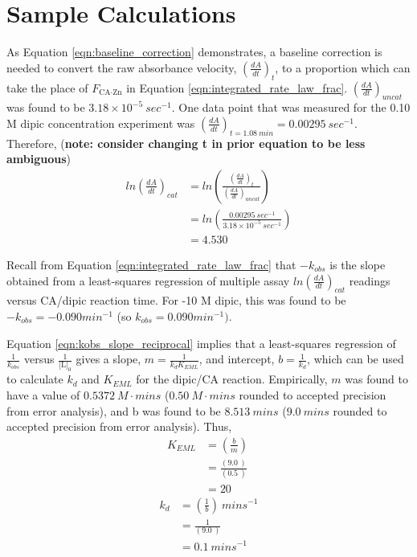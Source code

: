 \section{Sample Calculations}
As Equation \eqref{eqn:baseline_correction} demonstrates, a baseline correction is needed to convert the raw absorbance velocity, $\left(\frac{dA}{dt}\right)_{t}$, to a proportion which can take the place of $F_\text{CA$\cdot$Zn}$ in Equation \eqref{eqn:integrated_rate_law_frac}. $\left(\frac{dA}{dt}\right)_{uncat}$ was found to be $3.18\times10^{-5}\ sec^{-1}$. One data point that was measured for the 0.10 M dipic concentration experiment was $\left(\frac{dA}{dt}\right)_{t=1.08\ min}=0.00295\ sec^{-1}$. Therefore, (\textbf{note: consider changing t in prior equation to be less ambiguous}) 
\begin{equation*}
\begin{split}
ln \left(\frac{dA}{dt}\right)_{cat} 
&= ln \left( \frac{ \left (\frac{dA}{dt}\right)_{t} }{ \left (\frac{dA}{dt}\right)_{uncat} } \right) \\
&= ln \left( \frac{ 0.00295\ sec^{-1} }{ 3.18\times10^{-5}\ sec^{-1} } \right) \\
&= 4.530
\end{split}
\end{equation*} 

Recall from Equation \eqref{eqn:integrated_rate_law_frac} that $-k_{obs}$ is the slope obtained from a least-squares regression of multiple assay $ln \left(\frac{dA}{dt}\right)_{cat}$ readings versus CA/dipic reaction time. For -10 M dipic, this was found to be $-k_{obs}=-0.090 min^{-1}$ (so $k_{obs}=0.090 min^{-1})$.

Equation \eqref{eqn:kobs_slope_reciprocal} implies that a least-squares regression of $\frac{1}{k_{obs}}$ versus $\frac{1}{\text{[L]}_0}$ gives a slope, $m=\frac{1}{k_{d}K_{EML}}$, and intercept, $b=\frac{1}{k_{d}}$, which can be used to calculate $k_d$ and $K_{EML}$ for the dipic/CA reaction. Empirically, $m$ was found to have a value of $0.5372\ M\cdot{mins}$ ($0.50\ M\cdot{mins}$ rounded to accepted precision from error analysis), and b was found to be $8.513\ mins$ ($9.0\ mins$ rounded to accepted precision from error analysis). Thus,
\begin{equation}\label{eqn:samp_calc_keml}
\begin{split}
K_{EML}&=\left(\frac{b}{m}\right){\ }\\
&=\frac{\left (9.0{\ }\right )}{\left (0.5{\ }\right )}\\
&=20
\end{split}
\end{equation}
\begin{equation}\label{eqn:samp_calc_kd}
\begin{split}
k_{d}&=\left(\frac{1}{b}\right){\ }mins^{-1}\\
&=\frac{1}{\left (9.0{\ }\right )}\\
&=0.1\ mins^{-1}
\end{split}
\end{equation}